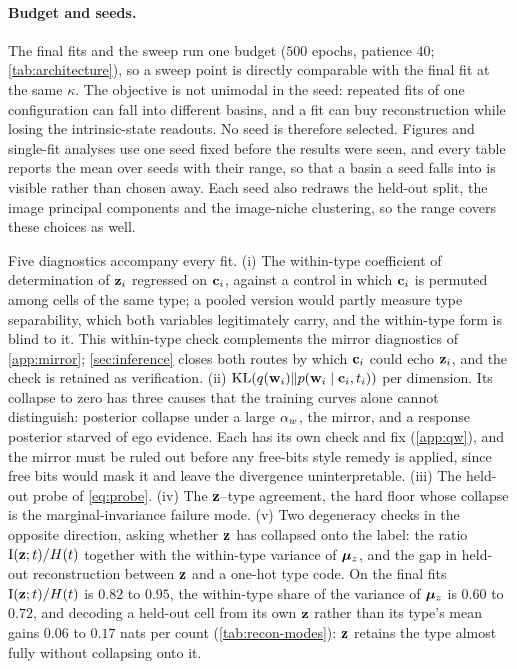 \paragraph{Budget and seeds.}
The final fits and the sweep run one budget ($500$ epochs, patience $40$; \cref{tab:architecture}), so a sweep point is directly comparable with the final fit at the same $\kappa$. The objective is not unimodal in the seed: repeated fits of one configuration can fall into different basins, and a fit can buy reconstruction while losing the intrinsic-state readouts. No seed is therefore selected. Figures and single-fit analyses use one seed fixed before the results were seen, and every table reports the mean over seeds with their range, so that a basin a seed falls into is visible rather than chosen away. Each seed also redraws the held-out split, the image principal components and the image-niche clustering, so the range covers these choices as well.

 Five diagnostics accompany every fit. (i) The within-type coefficient of determination of $\mathbf{z}_i$ regressed on $\mathbf{c}_i$, against a control in which $\mathbf{c}_i$ is permuted among cells of the same type; a pooled version would partly measure type separability, which both variables legitimately carry, and the within-type form is blind to it. This within-type check complements the mirror diagnostics of \cref{app:mirror}; \cref{sec:inference} closes both routes by which $\mathbf{c}_i$ could echo $\mathbf{z}_i$, and the check is retained as verification. (ii) $\operatorname{KL}(q(\mathbf{w}_i)\|p(\mathbf{w}_i \mid \mathbf{c}_i, t_i))$ per dimension. Its collapse to zero has three causes that the training curves alone cannot distinguish: posterior collapse under a large $\alpha_w$, the mirror, and a response posterior starved of ego evidence. Each has its own check and fix (\cref{app:qw}), and the mirror must be ruled out before any free-bits style remedy \citep{kingma2016} is applied, since free bits would mask it and leave the divergence uninterpretable. (iii) The held-out probe of \cref{eq:probe}. (iv) The $\mathbf{z}$--type agreement, the hard floor whose collapse is the marginal-invariance failure mode. (v) Two degeneracy checks in the opposite direction, asking whether $\mathbf{z}$ has collapsed onto the label: the ratio $\operatorname{I}(\mathbf{z};t)/H(t)$ together with the within-type variance of $\boldsymbol{\mu}_z$, and the gap in held-out reconstruction between $\mathbf{z}$ and a one-hot type code. On the final fits $\operatorname{I}(\mathbf{z};t)/H(t)$ is $0.82$ to $0.95$, the within-type share of the variance of $\boldsymbol{\mu}_z$ is $0.60$ to $0.72$, and decoding a held-out cell from its own $\mathbf{z}$ rather than its type's mean gains $0.06$ to $0.17$ nats per count (\cref{tab:recon-modes}): $\mathbf{z}$ retains the type almost fully without collapsing onto it.

